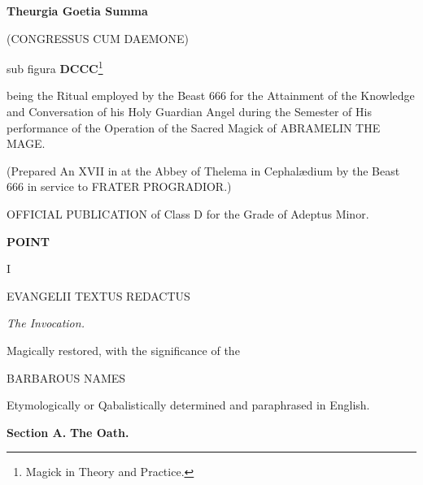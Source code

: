 
\begin{center}
  \large
  \textbf{Theurgia Goetia Summa}

  (CONGRESSUS CUM DAEMONE)

sub figura \textbf{DCCC}\footnote{Magick in Theory and Practice.}
\end{center}

being the Ritual employed by the Beast 666 for the Attainment of the Knowledge and Conversation of his Holy Guardian Angel during the Semester of His performance of the Operation of the Sacred Magick of ABRAMELIN THE MAGE.

(Prepared An XVII \sun{} in \virgo{} at the Abbey of Thelema in
Cephal\ae{}dium by the Beast 666 in service to FRATER PROGRADIOR.)

OFFICIAL PUBLICATION of \Argentium{} Class D for the Grade of Adeptus Minor.

\clearpage
\begin{center}
\textbf{POINT}

I

EVANGELII TEXTUS REDACTUS
\end{center}

\textit{The Invocation.}

Magically restored, with the significance of the

\begin{center}
  BARBAROUS NAMES
\end{center}

Etymologically or Qabalistically determined and paraphrased in English.

\textbf{Section A.} \hfill \textbf{The Oath.}

